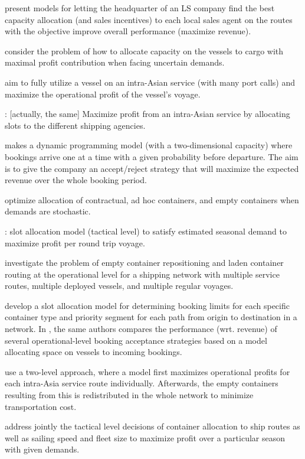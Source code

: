 \citet{Demirag07} present models for letting the headquarter of an LS company find the best capacity allocation (and sales incentives) to each local sales agent on the routes with the objective improve overall performance (maximize revenue).

\citet{Xianzhi07} consider the problem of how to allocate capacity on the vessels to cargo with maximal profit contribution when facing uncertain demands.

\citet{Feng07} aim to fully utilize a vessel on an intra-Asian service (with many port calls) and maximize the operational profit of the vessel's voyage.

\citet{Feng08}: [actually, the same] Maximize profit from an intra-Asian service by allocating slots to the different shipping agencies.

\citet{Bingzhou08} makes a dynamic programming model (with a two-dimensional capacity) where bookings arrive one at a time with a given probability before departure. The aim is to give the company an accept/reject strategy that will maximize the expected revenue over the whole booking period. 

\citet{Zou08} optimize allocation of contractual, ad hoc containers, and empty containers when demands are stochastic.

\citet{Lu10}: slot allocation model (tactical level) to satisfy estimated seasonal demand to maximize profit per round trip voyage.

\citet{Song12} investigate the problem of empty container repositioning and laden container routing at the operational level for a shipping network with multiple service routes, multiple deployed vessels, and multiple regular voyages.

\citet{Zurheide12} develop a slot allocation model for determining booking limits for each specific container type and priority segment for each path from origin to destination in a network.  
In \citet{Zurheide15}, the same authors compares the performance (wrt. revenue) of several operational-level booking acceptance strategies based on a model allocating space on vessels to incoming bookings. 

\citet{Chang15} use a two-level approach, where a model first maximizes operational profits for each intra-Asia service route individually. Afterwards, the empty containers resulting from this is redistributed in the whole network to minimize transportation cost.  

\citet{Wang15b} address jointly the tactical level decisions of container allocation to ship routes as well as sailing speed and fleet size to maximize profit over a particular season with given demands.


